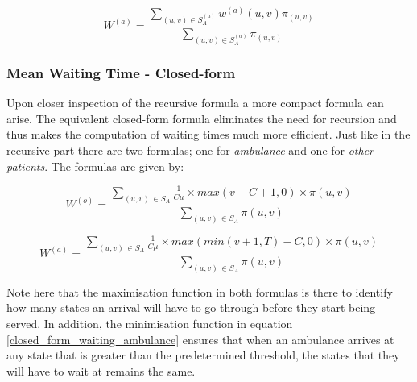 \begin{equation}
    W^{(a)} = \frac{\sum_{(u,v) \in S_A^{(a)}} w^{(a)}(u,v) \pi_{(u,v)}}{\sum_{(u,v) \in S_A^{(a)}} \pi_{(u,v)}}
\end{equation}

\subsubsection{Mean Waiting Time - Closed-form}
Upon closer inspection of the recursive formula a more compact formula can arise. The equivalent closed-form formula eliminates the need for recursion and thus makes the computation of waiting times much more efficient. Just like in the recursive part there are two formulas; one for \textit{ambulance} and one for \textit{other patients}. The formulas are given by:

\begin{equation}
    W^{(o)} = \frac{\sum_{(u,v) \, \in S_A} \frac{1}{C \mu} \times max(v-C+1,0) \times \pi(u,v)}{\sum_{(u,v) \, \in S_A} \pi(u,v)}
\end{equation}
    
\begin{equation}\label{closed_form_waiting_ambulance}
    W^{(a)} = \frac{\sum_{(u,v) \, \in S_A} \frac{1}{C \mu} \times max(min(v+1,T)-C,0) \times \pi(u,v)}{\sum_{(u,v) \, \in S_A} \pi(u,v)}
\end{equation}

Note here that the maximisation function in both formulas is there to identify how many states an arrival will have to go through before they start being served. In addition, the minimisation function in equation \ref{closed_form_waiting_ambulance} ensures that when an ambulance arrives at any state that is greater than the predetermined threshold, the states that they will have to wait at remains the same. 












